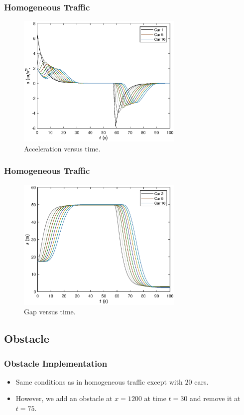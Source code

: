 \documentclass{beamer}
\begin{document}
\begin{frame}
  \frametitle{Homogeneous Traffic}
  \begin{figure}[H]
    \includegraphics[width=8cm]{HomogeneousTraffic3.eps}
    \caption{Acceleration versus time.}
\end{figure}
\end{frame}

\begin{frame}
  \frametitle{Homogeneous Traffic}
  \begin{figure}[H]
    \includegraphics[width=8cm]{HomogeneousTraffic4.eps}
    \caption{Gap versus time.}
\end{figure}
\end{frame}

\subsection{Obstacle}

\begin{frame}
  \frametitle{Obstacle Implementation}
  \begin{itemize}
    \item Same conditions as in homogeneous traffic except with $20$ cars. 
    \item However, we add an obstacle at $x=1200$ at time $t=30$ and remove it at $t=75$.
  \end{itemize}
\end{frame}
\end{document}
